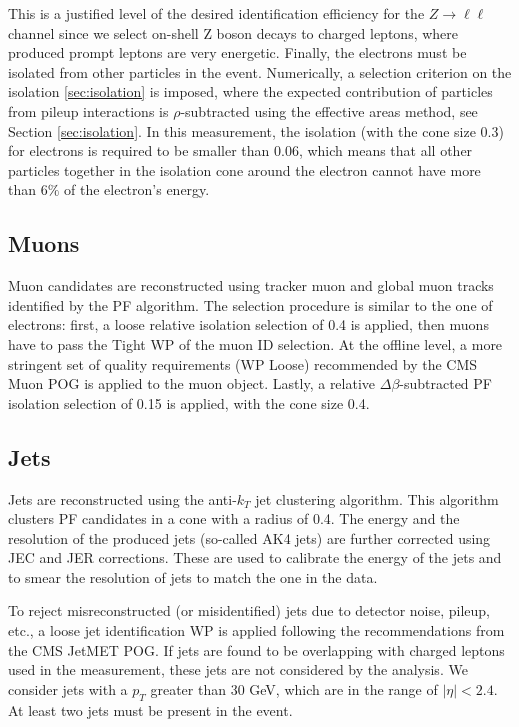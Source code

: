 This is a justified level of the desired identification efficiency for the $Z \to \ell \ell$ channel since we select on-shell Z boson decays to charged leptons, where produced prompt leptons are very energetic. Finally, the electrons must be isolated from other particles in the event. Numerically, a selection criterion on the isolation \ref{sec:isolation} is imposed, where the expected contribution of particles from pileup interactions is $\rho$-subtracted using the effective areas method, see Section \ref{sec:isolation}. In this measurement, the isolation (with the cone size 0.3) for electrons is required to be smaller than 0.06, which means that all other particles together in the isolation cone around the electron cannot have more than 6$\%$ of the electron's energy.

\subsection{Muons}\label{sec:muons}
Muon candidates are reconstructed using tracker muon and global muon tracks identified by the PF algorithm. The selection procedure is similar to the one of electrons: first, a loose relative isolation selection of 0.4 is applied, then muons have to pass the Tight WP of the muon ID selection. 
At the offline level, a more stringent set of quality requirements (WP Loose) recommended by the CMS Muon POG is applied to the muon object.
Lastly, a relative $\Delta\beta$-subtracted PF isolation selection of 0.15 is applied, with the cone size 0.4.

\subsection{Jets}\label{sec:jets}
Jets are reconstructed using the anti-$k_T$ jet clustering algorithm. This algorithm clusters PF candidates in a cone with a radius of 0.4. The energy and the resolution of the produced jets (so-called AK4 jets) are further corrected using JEC and JER corrections. These are used to calibrate the energy of the jets and to smear the resolution of jets to match the one in the data. 

To reject misreconstructed (or misidentified) jets due to detector noise, pileup, etc., a loose jet identification WP is applied following the recommendations from the CMS JetMET POG. If jets are found to be overlapping with charged leptons used in the measurement, these jets are not considered by the analysis. We consider jets with a $p_T$ greater than 30 GeV, which are in the range of $|\eta| < 2.4$. At least two jets must be present in the event. 


